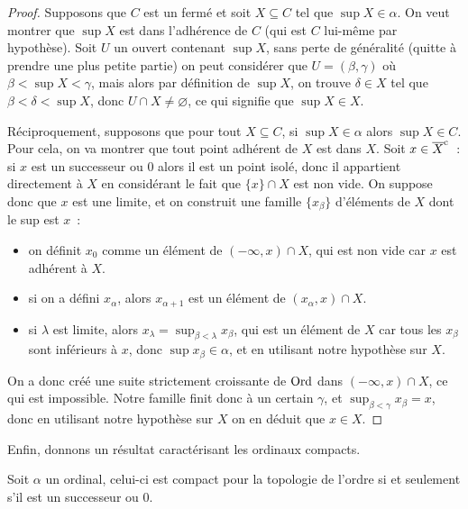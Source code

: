 \begin{proof}
  Supposons que $C$ est un fermé et soit $X\subseteq C$ tel que
  $\sup X \in \alpha$. On veut montrer que $\sup X$ est dans l'adhérence de $C$
  (qui est $C$ lui-même par hypothèse). Soit $U$ un ouvert contenant
  $\sup X$, sans perte de généralité (quitte à prendre une plus petite partie)
  on peut considérer que $U = (\beta, \gamma)$ où $\beta < \sup X < \gamma$,
  mais alors par définition de $\sup X$, on trouve $\delta \in X$ tel que
  $\beta < \delta < \sup X$, donc $U \cap X \neq\varnothing$, ce qui signifie
  que $\sup X \in X$.

  Réciproquement, supposons que pour tout $X\subseteq C$, si $\sup X \in \alpha$
  alors $\sup X \in C$. Pour cela, on va montrer que tout point adhérent de
  $X$ est dans $X$. Soit $x \in \overline{X}^{\mathrm c}$~: si $x$ est un successeur ou $0$
  alors il est un point isolé, donc il appartient directement à $X$ en
  considérant le fait que $\{x\}\cap X$ est non vide. On suppose donc que
  $x$ est une limite, et on construit une famille $\{x_\beta\}$ d'éléments de
  $X$ dont le sup est $x$~:
  \begin{itemize}
  \item on définit $x_0$ comme un élément de $(-\infty, x)\cap X$, qui est non
    vide car $x$ est adhérent à $X$.
  \item si on a défini $x_\alpha$, alors $x_{\alpha + 1}$ est un élément de
    $(x_\alpha,x)\cap X$.
  \item si $\lambda$ est limite, alors
    $x_{\lambda}=\sup_{\beta < \lambda}x_\beta$, qui est un élément de $X$ car
    tous les $x_\beta$ sont inférieurs à $x$, donc $\sup x_\beta\in \alpha$,
    et en utilisant notre hypothèse sur $X$.
  \end{itemize}
  On a donc créé une suite strictement croissante de $\operatorname{Ord}$ dans
  $(-\infty,x)\cap X$, ce qui est impossible. Notre famille finit donc à un
  certain $\gamma$, et $\sup_{\beta < \gamma} x_\beta = x$, donc en utilisant
  notre hypothèse sur $X$ on en déduit que $x\in X$.
\end{proof}

Enfin, donnons un résultat caractérisant les ordinaux compacts.

\begin{proposition}
  Soit $\alpha$ un ordinal, celui-ci est compact pour la topologie de l'ordre si
  et seulement s'il est un successeur ou $0$.
\end{proposition}

